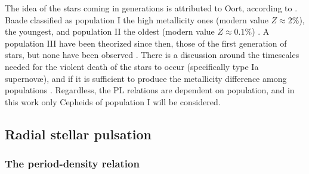 	The idea of the stars coming in generations is attributed to Oort, according to \cite{Baade1944}.
	Baade classified as population I the high metallicity ones (modern value $Z\approx 2\%$), the youngest, 
	and population II the oldest (modern value $Z\approx 0.1\%$) \citep{Carroll2017}. 
	A population III have been theorized since then, those of the first generation of stars, but none have been observed \citep{Heger2002}.
	There is a discussion around the timescales needed for the violent death of the stars to occur (specifically type Ia supernovæ), 
	and if it is sufficient to produce the metallicity difference among populations \citep{Carroll2017}.
	Regardless, the PL relations are dependent on population, and in this work only Cepheids of population I will be considered.
	
	
\subsection{Radial stellar pulsation}
	
	\subsubsection{The period-density relation}

